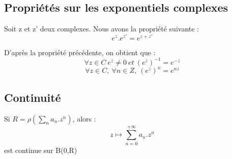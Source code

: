 \subsection{Propriétés sur les exponentiels complexes}
\begin{prop}
Soit z et z' deux complexes. Nous avons la propriété suivante :
$$e^z.e^{z'} = e^{z+z'}$$
\end{prop}
\begin{corr}
D'après la propriété précédente, on obtient que :
$$\forall z \in C~ e^z \neq 0~ et~ (e^z)^{-1} = e^{-z}$$
$$\forall z \in C,~ \forall n \in Z,~ (e^z)^n = e^{nz}$$
\end{corr}
\subsection{Continuité}
\begin{prop}
Si $R = \rho(\underset{n} \sum a_n.z^n)$, alors : 
$$z \mapsto \sum_{n=0}^{+\infty} a_n.z^n$$ 
est continue sur B(0,R)
\end{prop}
